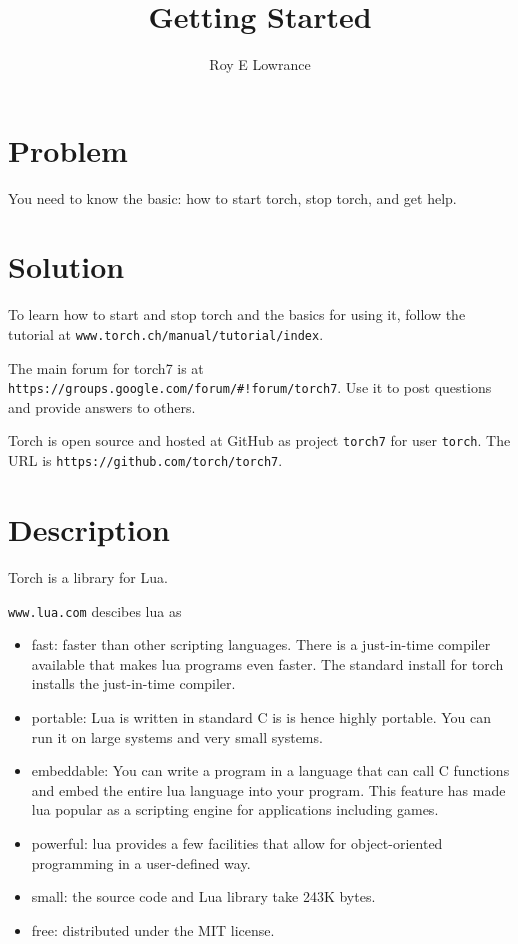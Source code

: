 \documentclass{article}
\let\code\texttt %
\begin{document}
\title{Getting Started}
\author{Roy E Lowrance}
\maketitle


\section{Problem}
You need to know the basic: how to start torch, stop torch, and get
help.

\section{Solution}

To learn how to start and stop torch and the basics for using it, follow
the tutorial at \code{www.torch.ch/manual/tutorial/index}.

The main forum for torch7  is at 
\code{https://groups.google.com/forum/\#!forum/torch7}. Use it to post
questions and provide answers to others.

Torch is open source and hosted at GitHub as project \code{torch7} for
user \code{torch}. The URL is \code{https://github.com/torch/torch7}. 

\section{Description}

Torch is a library for Lua.

\code{www.lua.com} descibes lua as
\begin{itemize}
  \item fast: faster than other scripting languages. There is a
    just-in-time compiler available that makes lua programs even faster.
    The standard install for torch installs the just-in-time compiler.
  \item portable: Lua is written in standard C is is hence highly
    portable. You can run it on large systems and very small systems.
  \item embeddable: You can write a program in a language that can call
    C functions and embed the entire lua language into your program.
    This feature has made lua popular as a scripting engine for
    applications including games.
  \item powerful: lua provides a few facilities that allow
    for object-oriented programming in a user-defined way.
  \item small: the source code and Lua library take 243K bytes.
  \item free: distributed under the MIT license.
\end{itemize}
\end{document}
